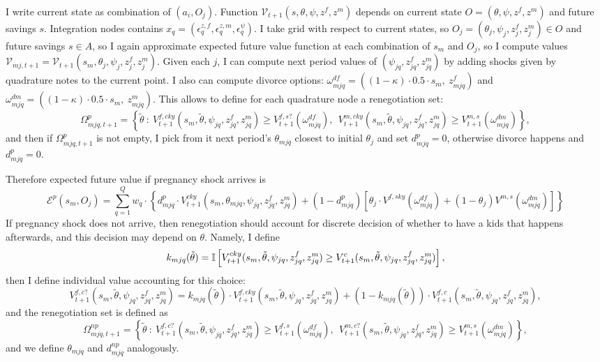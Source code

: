 I write current state as combination of $(a_i,O_j)$. Function $\mathcal{V}_{t+1}(s,\theta,\psi,z^f,z^m)$ depends on current state $O= (\theta,\psi,z^f,z^m)$ and future savings $s$.  Integration nodes contains $x_q = (\epsilon^{z,f}_q,\epsilon^{z,m}_q,\epsilon^{\psi}_q)$. I take grid with respect to current states, so $O_j= (\theta_j,\psi_j,z^f_j,z^m_j) \in O$ and future savings $s \in A$, so I again approximate expected future value function at each combination of $s_m$ and $O_j$, so I compute values $\mathcal{V}_{mj,t+1} = \mathcal{V}_{t+1}(s_m,\theta_j,\psi_j,z^f_j,z^m_j)$. Given each $j$, I can compute next period values of $(\psi_{jq},z^f_{jq},z^m_{jq})$ by adding shocks given by quadrature notes to the current point. I also can compute divorce options: $\omega^{df}_{mjq} = ( (1-\kappa)\cdot 0.5 \cdot s_m, \ z^f_{mjq})$ and $\omega^{dm}_{mjq} = ( (1-\kappa)\cdot 0.5 \cdot s_m, \ z^m_{mjq})$. This allows to define for each quadrature node a renegotiation set:
\[\Omega^{p}_{mjq,t+1} = \left\{ \tilde\theta \ : \ V^{f,cky}_{t+1}(s_m,\tilde\theta,\psi_{jq},z^f_{jq},z^m_{jq}) \geq V^{f,s?}_{t+1}(\omega^{df}_{mjq}), \ \ V^{m,cky}_{t+1}(s_m,\tilde\theta,\psi_{jq},z^f_{jq},z^m_{jq}) \geq V^{m,s}_{t+1}(\omega^{dm}_{mjq}) \right\},\]
and then if $\Omega^{p}_{mjq,t+1}$ is not empty, I pick from it next period's $\theta_{mjq}$ closest to initial $\theta_j$ and set $d^{p}_{mjq} = 0$, otherwise divorce happens and $d^{p}_{mjq} = 0$.

Therefore expected future value if pregnancy shock arrives is 
{\small
\[\mathcal{E}^{p}(s_m,O_j) = \sum\limits_{q=1}^{Q} w_q \cdot\left\{ d^p_{mjq}\cdot V_{t+1}^{cky}(s_m,\theta_{mjq},\psi_{jq},z^f_{jq},z^m_{jq}) + (1-d^p_{mjq}) [\theta_{j}\cdot V^{f,sky}(\omega^{df}_{mjq}) + (1-\theta_j)V^{m,s}(\omega^{dm}_{mjq})] \right\} \]
}
If pregnancy shock does not arrive, then renegotiation should account for discrete decision of whether to have a kids that happens afterwards, and this decision may depend on $\theta$. Namely, I define
\[k_{mjq}(\tilde\theta) = \mathbb{I}\left[ V^{cky}_{t+1}(s_m,\tilde\theta,\psi_{jq},z^f_{jq},z^m_{jq}) \geq V^{c}_{t+1}(s_m,\tilde\theta,\psi_{jq},z^f_{jq},z^m_{jq})\right],\]
then I define individual value accounting for this choice:
\[V^{f,c?}_{t+1}(s_m,\tilde\theta,\psi_{jq},z^f_{jq},z^m_{jq}) = k_{mjq}(\tilde\theta)\cdot V^{f,cky}_{t+1}(s_m,\tilde\theta,\psi_{jq},z^f_{jq},z^m_{jq}) + (1-k_{mjq}(\tilde\theta))\cdot V^{f,c}_{t+1}(s_m,\tilde\theta,\psi_{jq},z^f_{jq},z^m_{jq}),\]
and the renegotiation set is defined as
\[\Omega^{np}_{mjq,t+1} = \left\{ \tilde\theta \ : \ V^{f,c?}_{t+1}(s_m,\tilde\theta,\psi_{jq},z^f_{jq},z^m_{jq}) \geq V^{f,s}_{t+1}(\omega^{df}_{mjq}), \ \ V^{m,c?}_{t+1}(s_m,\tilde\theta,\psi_{jq},z^f_{jq},z^m_{jq}) \geq V^{m,s}_{t+1}(\omega^{dm}_{mjq}) \right\},\]
and we define $\theta_{mjq}$ and $d^{np}_{mjq}$ analogously.

